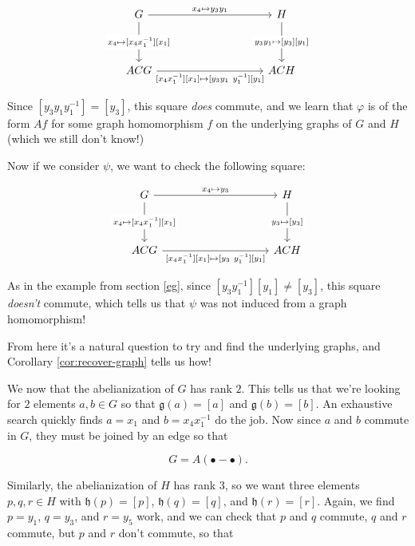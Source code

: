 \documentclass[12pt]{article}
\theoremstyle{definition}
\theoremstyle{theorem}
\begin{document}
\[\begin{tikzcd}
	G &&&& H \\
	\\
	ACG &&&& ACH
	\arrow["{x_4 \mapsto y_3 y_1}", from=1-1, to=1-5]
	\arrow["{x_4 \mapsto [x_4 x_1^{-1}][x_1]}"{description}, from=1-1, to=3-1]
	\arrow["{y_3 y_1 \mapsto [y_3][y_1]}"{description}, from=1-5, to=3-5]
	\arrow["{[x_4 x_1^{-1}][x_1] \mapsto [y_3 y_1 \ y_1^{-1}][y_1]}"', from=3-1, to=3-5]
\end{tikzcd}\]

Since $[y_3 y_1 y_1^{-1}] = [y_3]$, this square \emph{does} 
commute, and we learn that $\varphi$ is of the form $A f$ for some 
graph homomorphism $f$ on the underlying graphs of $G$ and $H$ 
(which we still don't know!)

Now if we consider $\psi$, we want to check the following square:

\[\begin{tikzcd}
	G &&&& H \\
	\\
	ACG &&&& ACH
	\arrow["{x_4 \mapsto y_3}", from=1-1, to=1-5]
	\arrow["{x_4 \mapsto [x_4 x_1^{-1}][x_1]}"{description}, from=1-1, to=3-1]
	\arrow["{y_3 \mapsto [y_3]}"{description}, from=1-5, to=3-5]
	\arrow["{[x_4 x_1^{-1}][x_1] \mapsto [y_3 \ y_1^{-1}][y_1]}"', from=3-1, to=3-5]
\end{tikzcd}\]

As in the example from section \ref{eg}, since $[y_3 y_1^{-1}][y_1] \neq [y_3]$,
this square \emph{doesn't} commute, which tells us that $\psi$ was not 
induced from a graph homomorphism!

\bigskip

From here it's a natural question to try and find the underlying graphs, 
and Corollary \ref{cor:recover-graph} tells us how!

We now that the abelianization of $G$ has rank $2$. 
This tells us that we're looking for $2$ elements $a,b \in G$ so 
that $\mathfrak{g}(a) = [a]$ and $\mathfrak{g}(b) = [b]$. An exhaustive 
search quickly finds $a = x_1$ and $b = x_4 x_1^{-1}$ do the job. Now 
since $a$ and $b$ commute in $G$, they must be joined by an edge so that 

\[ G = A(\bullet - \bullet) .\]

Similarly, the abelianization of $H$ has rank $3$, so we want three elements 
$p,q,r \in H$ with $\mathfrak{h}(p) = [p]$, $\mathfrak{h}(q) = [q]$, and 
$\mathfrak{h}(r) = [r]$. Again, we find $p = y_1$, $q = y_3$, and $r = y_5$ 
work, and we can check that $p$ and $q$ commute, $q$ and $r$ commute, but 
$p$ and $r$ don't commute, so that 
\end{document}
